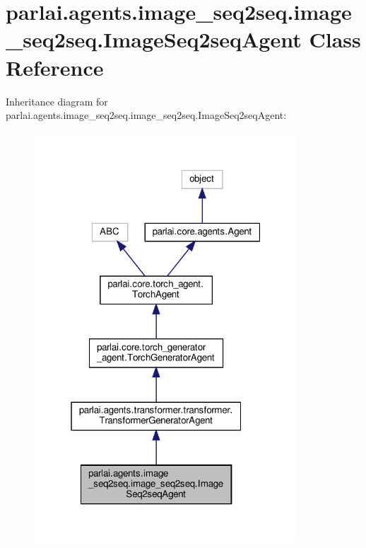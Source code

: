 \hypertarget{classparlai_1_1agents_1_1image__seq2seq_1_1image__seq2seq_1_1ImageSeq2seqAgent}{}\section{parlai.\+agents.\+image\+\_\+seq2seq.\+image\+\_\+seq2seq.\+Image\+Seq2seq\+Agent Class Reference}
\label{classparlai_1_1agents_1_1image__seq2seq_1_1image__seq2seq_1_1ImageSeq2seqAgent}


Inheritance diagram for parlai.\+agents.\+image\+\_\+seq2seq.\+image\+\_\+seq2seq.\+Image\+Seq2seq\+Agent\+:
\nopagebreak
\begin{figure}[H]
\begin{center}
\leavevmode
\includegraphics[width=280pt]{df/d0a/classparlai_1_1agents_1_1image__seq2seq_1_1image__seq2seq_1_1ImageSeq2seqAgent__inherit__graph}
\end{center}
\end{figure}


